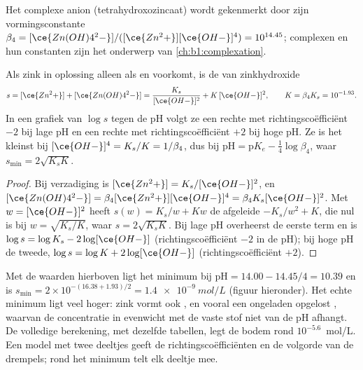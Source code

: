 Het complexe anion  (tetrahydroxozincaat) wordt
gekenmerkt door zijn vormingsconstante
$\beta_4 = [\ce{Zn(OH)4^2-}]/([\ce{Zn^2+}][\ce{OH-}]^4)
= 10^{14.45}$; complexen en hun constanten zijn het onderwerp van
\cref{ch:b1:complexation}.

\begin{proposition}\label{prop:b1:precipitation:amphoteric}
Als zink in oplossing alleen als  en  voorkomt,
is de  van zinkhydroxide
\[
  s = [\ce{Zn^2+}] + [\ce{Zn(OH)4^2-}] = \frac{K_s}{[\ce{OH-}]^2} + K\,[\ce{OH-}]^2,
  \qquad K = \beta_4 K_s = 10^{-1.93} .
\]
In een grafiek van $\log s$ tegen de pH volgt ze een rechte met
richtingscoëfficiënt $-2$ bij lage pH en een rechte met
richtingscoëfficiënt $+2$ bij hoge pH. Ze is het kleinst bij
$[\ce{OH-}]^4 = K_s/K = 1/\beta_4$, dus bij $\mathrm{pH} =
\mathrm{p}K_e - \frac14\log\beta_4$, waar $s_{\min} = 2\sqrt{K_s K}$.
\end{proposition}

\begin{proof}
Bij verzadiging is $[\ce{Zn^2+}] = K_s/[\ce{OH-}]^2$, en
$[\ce{Zn(OH)4^2-}] = \beta_4[\ce{Zn^2+}][\ce{OH-}]^4 = \beta_4 K_s
[\ce{OH-}]^2$. Met $w = [\ce{OH-}]^2$ heeft $s(w) = K_s/w + Kw$ de
afgeleide $-K_s/w^2 + K$, die nul is bij $w = \sqrt{K_s/K}$, waar
$s = 2\sqrt{K_s K}$. Bij lage pH overheerst de eerste term en is
$\log s = \log K_s - 2\log[\ce{OH-}]$ (richtingscoëfficiënt $-2$ in de
pH); bij hoge pH de tweede, $\log s = \log K + 2\log[\ce{OH-}]$
(richtingscoëfficiënt $+2$).
\end{proof}

Met de waarden hierboven ligt het minimum bij $\mathrm{pH} = 14.00 - 14.45/4
= 10.39$ en is $s_{\min} = 2 \times 10^{-(16.38 + 1.93)/2} =
\qty{1.4e-9}{mol/L}$
(figuur hieronder). Het echte minimum ligt veel hoger: zink vormt ook
,  en vooral een ongeladen opgelost
, waarvan de concentratie in evenwicht met de vaste stof
niet van de pH afhangt. De volledige berekening, met dezelfde tabellen,
legt de bodem rond
$10^{-5.6}$~mol/L. Een model met twee deeltjes geeft de
richtingscoëfficiënten en de volgorde van de drempels; rond het minimum
telt elk deeltje mee.

